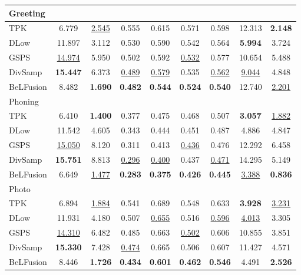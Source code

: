 \documentclass[10pt,twocolumn,letterpaper]{article}
\begin{document}
\begin{table*}[t!]
\begin{minipage}{0.495\textwidth}
\begin{tabular}{lcccccccc@{\hskip 2mm}}
Greeting \\
\midrule
TPK & 6.779 & \underline{2.545} & 0.555 & 0.615 & 0.571 & 0.598 & 12.313 & \textbf{2.148} \\
DLow & 11.897 & 3.112 & 0.530 & 0.590 & 0.542 & 0.564 & \textbf{5.994} & 3.724 \\
GSPS & \underline{14.974} & 5.950 & 0.502 & 0.592 & \underline{0.532} & 0.577 & 10.654 & 5.488 \\
DivSamp & \textbf{15.447} & 6.373 & \underline{0.489} & \underline{0.579} & 0.535 & \underline{0.562} & \underline{9.044} & 4.848 \\
BeLFusion & 8.482 & \textbf{1.690} & \textbf{0.482} & \textbf{0.544} & \textbf{0.524} & \textbf{0.540} & 12.740 & \underline{2.201} \\
\midrule

Phoning \\
\midrule
TPK & 6.410 & \textbf{1.400} & 0.377 & 0.475 & 0.468 & 0.507 & \textbf{3.057} & \underline{1.882} \\
DLow & 11.542 & 4.605 & 0.343 & 0.444 & 0.451 & 0.487 & 4.886 & 4.847 \\
GSPS & \underline{15.050} & 8.120 & 0.311 & 0.413 & \underline{0.436} & 0.476 & 12.292 & 6.458 \\
DivSamp & \textbf{15.751} & 8.813 & \underline{0.296} & \underline{0.400} & 0.437 & \underline{0.471} & 14.295 & 5.149 \\
BeLFusion & 6.649 & \underline{1.477} & \textbf{0.283} & \textbf{0.375} & \textbf{0.426} & \textbf{0.445} & \underline{3.388} & \textbf{0.836} \\
\midrule

Photo \\
\midrule
TPK & 6.894 & \underline{1.884} & 0.541 & 0.689 & 0.548 & 0.633 & \textbf{3.928} & \underline{3.231} \\
DLow & 11.931 & 4.180 & 0.507 & \underline{0.655} & 0.516 & \underline{0.596} & \underline{4.013} & 3.305 \\
GSPS & \underline{14.310} & 6.482 & 0.485 & 0.663 & \underline{0.502} & 0.606 & 10.855 & 3.851 \\
DivSamp & \textbf{15.330} & 7.428 & \underline{0.474} & 0.665 & 0.506 & 0.607 & 11.427 & 4.571 \\
BeLFusion & 8.446 & \textbf{1.726} & \textbf{0.434} & \textbf{0.601} & \textbf{0.462} & \textbf{0.546} & 4.491 & \textbf{2.526} \\
\midrule


\end{tabular}
\end{minipage}
\end{table*}
\end{document}
